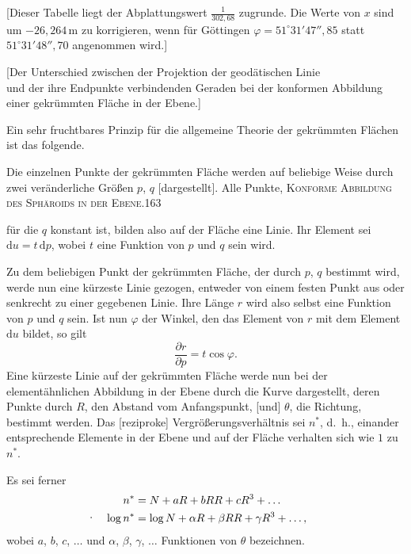 [Dieser Tabelle liegt der Abplattungswert $\frac1{302{,}68}$ zugrunde. Die Werte von $x$ sind um $-26{,}264\,\mathrm m$ zu korrigieren, wenn für Göttingen $\varphi=51^\circ31'47''{,}85$ statt $51^\circ31'48''{,}70$ angenommen wird.]
\bigskip
\begin{center}
[Der Unterschied zwischen der Projektion der geodätischen Linie\\und der ihre Endpunkte verbindenden Geraden bei der konformen Abbildung\\einer gekrümmten Fläche in der Ebene.]\par\medskip
[16.]
\end{center}
Ein sehr fruchtbares Prinzip für die allgemeine Theorie der gekrümmten Flächen ist das folgende.

Die einzelnen Punkte der gekrümmten Fläche werden auf beliebige Weise durch zwei veränderliche Größen $p$, $q$ [dargestellt]. Alle Punkte,
\clearpage
\noindent\mbox{}\hfill\textsc{Konforme Abbildung des Sphäroids in der Ebene.}\hfill163\par\medskip
\noindent für die $q$ konstant ist, bilden also auf der Fläche eine Linie. Ihr Element sei $\mathrm du=t\,\mathrm dp$, wobei $t$ eine Funktion von $p$ und $q$ sein wird.

Zu dem beliebigen Punkt der gekrümmten Fläche, der durch $p$, $q$ bestimmt wird, werde nun eine kürzeste Linie gezogen, entweder von einem festen Punkt aus oder senkrecht zu einer gegebenen Linie. Ihre Länge $r$ wird also selbst eine Funktion von $p$ und $q$ sein. Ist nun $\varphi$ der Winkel, den das Element von $r$ mit dem Element $\mathrm du$ bildet, so gilt
\[
\frac{\partial r}{\partial p}=t\cos\varphi.
\]
Eine kürzeste Linie auf der gekrümmten Fläche werde nun bei der elementähnlichen Abbildung in der Ebene durch die Kurve dargestellt, deren Punkte durch $R$, den Abstand vom Anfangspunkt, [und] $\theta$, die Richtung, bestimmt werden. Das [reziproke] Vergrößerungsverhältnis sei $n^*$, d.~h., einander entsprechende Elemente in der Ebene und auf der Fläche verhalten sich wie $1$ zu $n^*$.

Es sei ferner
\[
\begin{aligned}
n^*&=N+aR+bRR+cR^3+\ldots\\
\rlap{\hspace{-1.4em}\raisebox{.7ex}{.}}\log n^*&=\log N+\alpha R+\beta RR+\gamma R^3+\ldots,
\end{aligned}
\]
wobei $a$, $b$, $c$, $\ldots$ und $\alpha$, $\beta$, $\gamma$, $\ldots$ Funktionen von $\theta$ bezeichnen.

